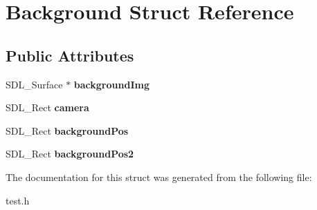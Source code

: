 \hypertarget{structBackground}{}\section{Background Struct Reference}
\label{structBackground}
\subsection*{Public Attributes}
\begin{DoxyCompactItemize}
\item 
S\+D\+L\+\_\+\+Surface $\ast$ {\bfseries background\+Img}\hypertarget{structBackground_ade7f4649cb1e02ab75167ce898db884c}{}\label{structBackground_ade7f4649cb1e02ab75167ce898db884c}

\item 
S\+D\+L\+\_\+\+Rect {\bfseries camera}\hypertarget{structBackground_a6f0eda65be9d4a6137434c8cfc14d941}{}\label{structBackground_a6f0eda65be9d4a6137434c8cfc14d941}

\item 
S\+D\+L\+\_\+\+Rect {\bfseries background\+Pos}\hypertarget{structBackground_a81fdaea521be13c6634186f72b105e33}{}\label{structBackground_a81fdaea521be13c6634186f72b105e33}

\item 
S\+D\+L\+\_\+\+Rect {\bfseries background\+Pos2}\hypertarget{structBackground_ab8b75009d7f68a121a02297cc23e6051}{}\label{structBackground_ab8b75009d7f68a121a02297cc23e6051}

\end{DoxyCompactItemize}


The documentation for this struct was generated from the following file\+:\begin{DoxyCompactItemize}
\item 
test.\+h\end{DoxyCompactItemize}
